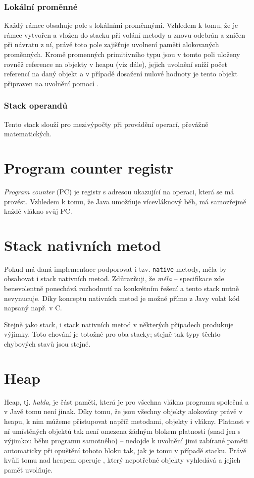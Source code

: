 \subsubsection{Lokální proměnné}
Každý rámec obsahuje pole s lokálními proměnnými. Vzhledem k tomu, že je rámec vytvořen a vložen do  stacku při volání metody a znovu odebrán a zničen při návratu z ní, právě toto pole zajišťuje uvolnení paměti alokovaných proměnných. Kromě promenných primitivního typu jsou v tomto poli uloženy rovněž reference na objekty v heapu (viz dále), jejich uvolnění sníží počet referencí na daný objekt a v případě dosažení nulové hodnoty je tento objekt připraven na uvolnění pomocí .

\subsubsection{Stack operandů}
Tento stack slouží pro mezivýpočty při provádění operací, převážně matematických.

\section{Program counter registr}
\textit{Program counter} (PC) je registr s adresou ukazující na operaci, která se má provést. Vzhledem k tomu, že Java umožňuje vícevláknový běh, má samozřejmě každé vlákno svůj PC. 

\section{Stack nativních metod}
Pokud má daná implementace  podporovat i tzv. \texttt{native} metody, měla by obsahovat i stack nativních metod. Zdůrazňuji, že \textit{měla} -- specifikace zde benevolentně ponechává rozhodnutí na konkrétním řešení a tento stack nutně nevynucuje. Díky konceptu nativních metod je možné přímo z Javy volat kód napsaný např. v C. 

Stejně jako  stack, i stack nativních metod v některých případech produkuje výjimky. Toto chování je totožné pro oba stacky; stejně tak typy těchto chybových stavů jsou stejné.

\section{Heap}
Heap, tj. \textit{halda}, je část paměti, která je pro všechna vlákna programu společná a v Javě tomu není jinak. Díky tomu, že jsou všechny objekty alokovány právě v heapu, k nim můžeme přistupovat napříč metodami, objekty i vlákny. Platnost v ní umístěných objektů tak není omezena žádným blokem platnosti (snad jen s výjimkou běhu programu samotného) -- nedojde k uvolnění jimi zabírané paměti automaticky při opuštění tohoto bloku tak, jak je tomu v případě stacku. Právě kvůli tomu nad heapem operuje , který nepotřebné objekty vyhledává a jejich paměť uvolňuje.

